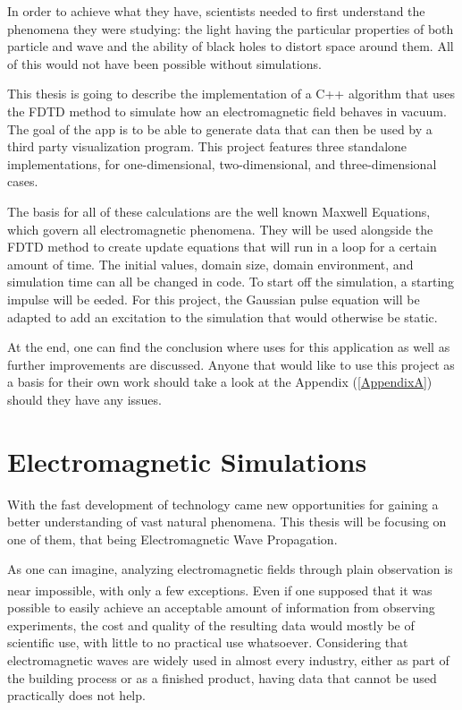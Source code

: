 In order to achieve what they have, scientists needed to first understand the phenomena they were studying: the light having the particular properties of both particle and wave and the ability of black holes to distort space around them. All of this would not have been possible without simulations. 

This thesis is going to describe the implementation of a C++ algorithm that uses the FDTD method to simulate how an electromagnetic field behaves in vacuum. The goal of the app is to be able to generate data that can then be used by a third party visualization program. This project features three standalone implementations, for one-dimensional, two-dimensional, and three-dimensional cases.

The basis for all of these calculations are the well known Maxwell Equations, which govern all electromagnetic phenomena. They will be used alongside the FDTD method to create update equations that will run in a loop for a certain amount of time. The initial values, domain size, domain environment, and simulation time can all be changed in code. To start off the simulation, a starting impulse will be eeded. For this project, the Gaussian pulse equation will be adapted to add an excitation to the simulation that would otherwise be static. 

At the end, one can find the conclusion where uses for this application as well as further improvements are discussed. Anyone that would like to use this project as a basis for their own work should take a look at the Appendix (\ref{AppendixA}) should they have any issues.


\section{Electromagnetic Simulations}
With the fast development of technology came new opportunities for gaining a better understanding of vast natural phenomena. This thesis will be focusing on one of them, that being Electromagnetic Wave Propagation. 

As one can imagine, analyzing electromagnetic fields through plain observation is near impossible, with only a few exceptions\textsuperscript{\cite{cao2005first}}. Even if one supposed that it was possible to easily achieve an acceptable amount of information from observing experiments, the cost and quality of the resulting data would mostly be of scientific use, with little to no practical use whatsoever. Considering that electromagnetic waves are widely used in almost every industry, either as part of the building process or as a finished product, having data that cannot be used practically does not help. 

